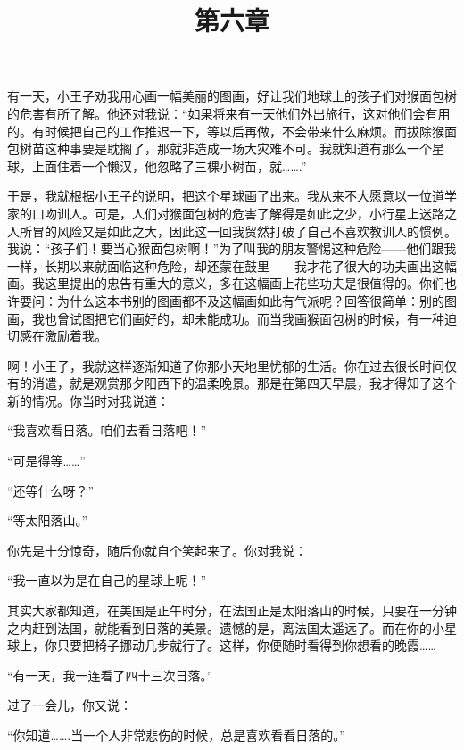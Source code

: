 有一天，小王子劝我用心画一幅美丽的图画，好让我们地球上的孩子们对猴面包树的危害有所了解。他还对我说：“如果将来有一天他们外出旅行，这对他们会有用的。有时候把自己的工作推迟一下，等以后再做，不会带来什么麻烦。而拔除猴面包树苗这种事要是耽搁了，那就非造成一场大灾难不可。我就知道有那么一个星球，上面住着一个懒汉，他忽略了三棵小树苗，就\ldots{}\ldots{}.”

{\startalignment[center]
 \stopalignment}

于是，我就根据小王子的说明，把这个星球画了出来。我从来不大愿意以一位道学家的口吻训人。可是，人们对猴面包树的危害了解得是如此之少，小行星上迷路之人所冒的风险又是如此之大，因此这一回我贸然打破了自己不喜欢教训人的惯例。我说：“孩子们！要当心猴面包树啊！”为了叫我的朋友警惕这种危险------他们跟我一样，长期以来就面临这种危险，却还蒙在鼓里------我才花了很大的功夫画出这幅画。我这里提出的忠告有重大的意义，多在这幅画上花些功夫是很值得的。你们也许要问：为什么这本书别的图画都不及这幅画如此有气派呢？回答很简单：别的图画，我也曾试图把它们画好的，却未能成功。而当我画猴面包树的时候，有一种迫切感在激励着我。

\title{第六章}

啊！小王子，我就这样逐渐知道了你那小天地里忧郁的生活。你在过去很长时间仅有的消遣，就是观赏那夕阳西下的温柔晚景。那是在第四天早晨，我才得知了这个新的情况。你当时对我说道：

“我喜欢看日落。咱们去看日落吧！”

“可是得等\ldots{}\ldots{}”

“还等什么呀？”

“等太阳落山。”

你先是十分惊奇，随后你就自个笑起来了。你对我说：

“我一直以为是在自己的星球上呢！”

其实大家都知道，在美国是正午时分，在法国正是太阳落山的时候，只要在一分钟之内赶到法国，就能看到日落的美景。遗憾的是，离法国太遥远了。而在你的小星球上，你只要把椅子挪动几步就行了。这样，你便随时看得到你想看的晚霞\ldots{}\ldots{}

{\startalignment[center]
 \stopalignment}

“有一天，我一连看了四十三次日落。”

过了一会儿，你又说：

“你知道\ldots{}\ldots{}.当一个人非常悲伤的时候，总是喜欢看看日落的。”

